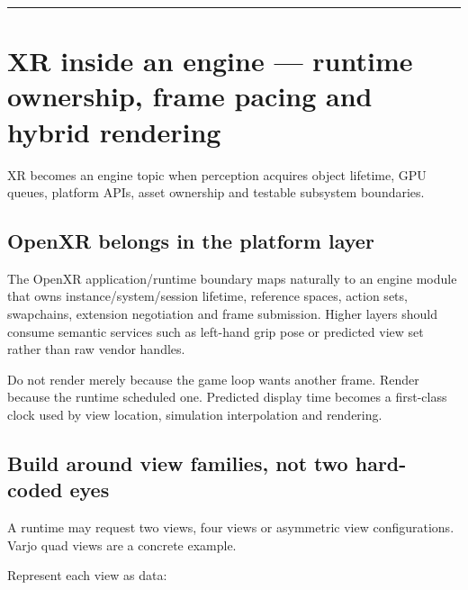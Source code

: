 \begin{center}\rule{0.5\linewidth}{0.5pt}\end{center}

\section{XR inside an engine --- runtime ownership, frame pacing and hybrid rendering}\label{06-engine-ii-ch042-xr-inside-an-engine-runtime-ownership-frame-pacing-and-hybrid-rendering}

\hypertarget{06-engine-ii-ch042-xr-inside-an-engine-runtime-ownership-frame-pacing-and-hybrid-rendering}{}

XR becomes an engine topic when perception acquires object lifetime, GPU queues, platform APIs, asset ownership and testable subsystem boundaries.

\subsection{OpenXR belongs in the platform layer}\label{06-engine-ii-ch042-openxr-belongs-in-the-platform-layer}

\hypertarget{06-engine-ii-ch042-openxr-belongs-in-the-platform-layer}{}

The OpenXR application/runtime boundary maps naturally to an engine module that owns instance/system/session lifetime, reference spaces, action sets, swapchains, extension negotiation and frame submission. Higher layers should consume semantic services such as left-hand grip pose or predicted view set rather than raw vendor handles.

Do not render merely because the game loop wants another frame. Render because the runtime scheduled one. Predicted display time becomes a first-class clock used by view location, simulation interpolation and rendering.

\subsection{Build around view families, not two hard-coded eyes}\label{06-engine-ii-ch042-build-around-view-families-not-two-hard-coded-eyes}

\hypertarget{06-engine-ii-ch042-build-around-view-families-not-two-hard-coded-eyes}{}

A runtime may request two views, four views or asymmetric view configurations. Varjo quad views are a concrete example.

Represent each view as data:

